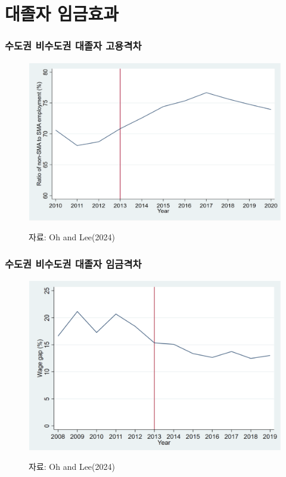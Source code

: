 \documentclass[aspectratio=169,xcolor=dvipsnames,handout]{beamer}
\begin{document}
\section{대졸자 임금효과}%
\begin{frame}
    \frametitle{수도권 비수도권 대졸자 고용격차}
    \centering
    \begin{figure}
        \includegraphics[width=.7\textwidth]{pic/고용격차.png}
    \\
    \raggedright
    \hspace{1em}
    \tiny{자료: Oh and Lee(2024)}
    \end{figure}
\end{frame}

\begin{frame}
    \frametitle{수도권 비수도권 대졸자 임금격차}
    \centering
    \begin{figure}
        \includegraphics[width=.6\textwidth]{pic/임금격차.png}
    \\
    \raggedright
    \hspace{1em}
    \tiny{자료: Oh and Lee(2024)}
    \end{figure}
\end{frame}
\end{document}
